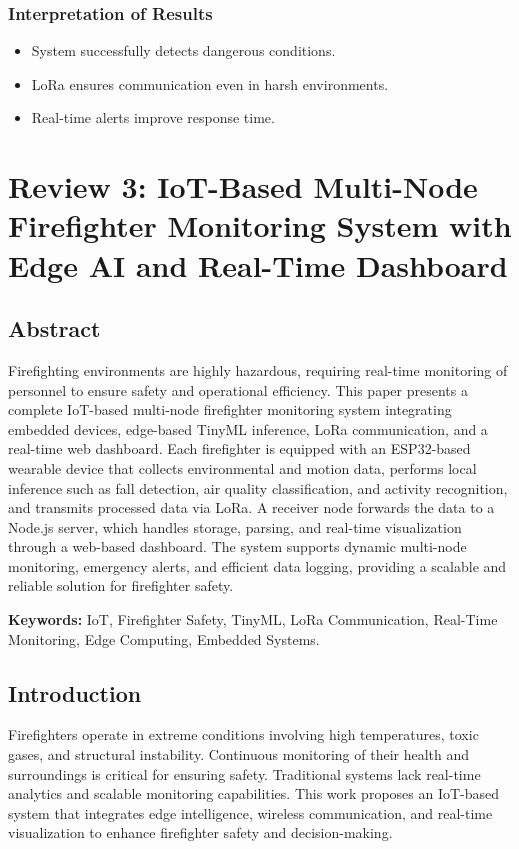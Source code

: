 \documentclass[12pt,a4paper]{article}
\begin{document}
	\subsubsection{Interpretation of Results}
	\begin{itemize}
		\item System successfully detects dangerous conditions.
		\item LoRa ensures communication even in harsh environments.
		\item Real-time alerts improve response time.
	\end{itemize}
	
	\section{Review 3: IoT-Based Multi-Node Firefighter Monitoring System with Edge AI and Real-Time Dashboard}
	
	\subsection{Abstract}
	Firefighting environments are highly hazardous, requiring real-time monitoring of personnel to ensure safety and operational efficiency. This paper presents a complete IoT-based multi-node firefighter monitoring system integrating embedded devices, edge-based TinyML inference, LoRa communication, and a real-time web dashboard. Each firefighter is equipped with an ESP32-based wearable device that collects environmental and motion data, performs local inference such as fall detection, air quality classification, and activity recognition, and transmits processed data via LoRa. A receiver node forwards the data to a Node.js server, which handles storage, parsing, and real-time visualization through a web-based dashboard. The system supports dynamic multi-node monitoring, emergency alerts, and efficient data logging, providing a scalable and reliable solution for firefighter safety.
	
	\noindent\textbf{Keywords:} IoT, Firefighter Safety, TinyML, LoRa Communication, Real-Time Monitoring, Edge Computing, Embedded Systems.
	
	\subsection{Introduction}
	Firefighters operate in extreme conditions involving high temperatures, toxic gases, and structural instability. Continuous monitoring of their health and surroundings is critical for ensuring safety. Traditional systems lack real-time analytics and scalable monitoring capabilities. This work proposes an IoT-based system that integrates edge intelligence, wireless communication, and real-time visualization to enhance firefighter safety and decision-making.
	
\end{document}
